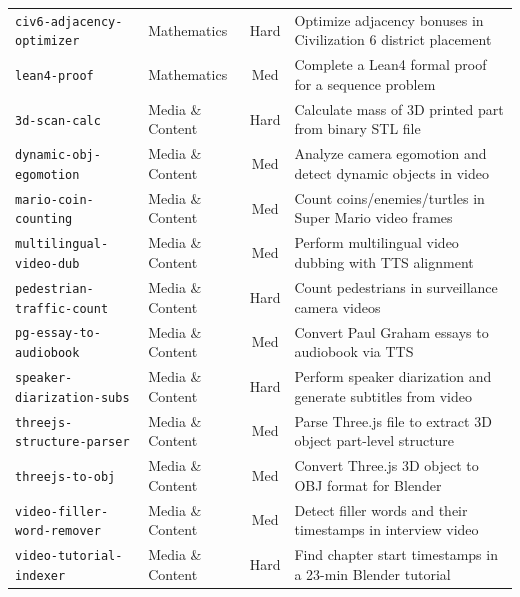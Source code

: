\begin{longtable}{p{4.5cm}p{2.5cm}cp{7.5cm}}
\texttt{civ6-adjacency-optimizer} & Mathematics & Hard & Optimize adjacency bonuses in Civilization 6 district placement \\
\texttt{lean4-proof} & Mathematics & Med & Complete a Lean4 formal proof for a sequence problem \\
\midrule

\texttt{3d-scan-calc} & Media \& Content & Hard & Calculate mass of 3D printed part from binary STL file \\
\texttt{dynamic-obj-egomotion} & Media \& Content & Med & Analyze camera egomotion and detect dynamic objects in video \\
\texttt{mario-coin-counting} & Media \& Content & Med & Count coins/enemies/turtles in Super Mario video frames \\
\texttt{multilingual-video-dub} & Media \& Content & Med & Perform multilingual video dubbing with TTS alignment \\
\texttt{pedestrian-traffic-count} & Media \& Content & Hard & Count pedestrians in surveillance camera videos \\
\texttt{pg-essay-to-audiobook} & Media \& Content & Med & Convert Paul Graham essays to audiobook via TTS \\
\texttt{speaker-diarization-subs} & Media \& Content & Hard & Perform speaker diarization and generate subtitles from video \\
\texttt{threejs-structure-parser} & Media \& Content & Med & Parse Three.js file to extract 3D object part-level structure \\
\texttt{threejs-to-obj} & Media \& Content & Med & Convert Three.js 3D object to OBJ format for Blender \\
\texttt{video-filler-word-remover} & Media \& Content & Med & Detect filler words and their timestamps in interview video \\
\texttt{video-tutorial-indexer} & Media \& Content & Hard & Find chapter start timestamps in a 23-min Blender tutorial \\
\midrule


\end{longtable}
